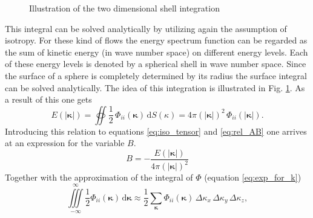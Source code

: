 \documentclass[preprint,12pt,ntfdMod]{elsarticle}
\begin{document}
\begin{par}
\begin{figure}[t!]
      \label{fig:shell_int}
      \caption{Illustration of the two dimensional shell integration}
  \end{figure}
This integral can be solved analytically by utilizing again the assumption of isotropy.
For these kind of flows the energy spectrum function can be regarded as the sum of kinetic energy
(in wave number space) on different energy levels. Each of these energy levels is denoted by a spherical
shell in wave number space. Since the surface of a sphere is completely determined by its radius the
surface integral can be solved analytically. The idea of this integration is illustrated
in Fig. \ref{fig:shell_int}.
As a result of this one gets
  \begin{equation}
      E(|\boldsymbol\kappa|)=\oiint\frac{1}{2}\,\Phi_{ii}(\boldsymbol\kappa)\,\mathrm{d}S(\kappa)
      =4\pi(|\boldsymbol\kappa|)^2\,\Phi_{ii}(|\boldsymbol\kappa|).
  \end{equation}
Introducing this relation to equations \eqref{eq:iso_tensor} and
\eqref{eq:rel_AB} one arrives at an expression for the variable $B$.
  \begin{equation}
      B=-\frac{E(|\boldsymbol\kappa|)}{4\pi(|\boldsymbol\kappa|)^2}
  \end{equation}
Together with the approximation of the integral of $\Phi$
(equation \eqref{eq:exp_for_k})
  \begin{equation}
      \label{eq:Phi_approx}
      \iiint\limits_{-\infty}^{\infty}\frac{1}{2}\Phi_{ii}(\boldsymbol\kappa)\,\mathrm{d}\boldsymbol\kappa
      \approx\frac{1}{2}\sum\limits_{\boldsymbol\kappa}\Phi_{ii}(\boldsymbol\kappa)
      \,\Delta\kappa_x\,\Delta\kappa_y\,\Delta\kappa_z,
  \end{equation}
\begin{figure}[t!]
      \centering

\end{figure}
\end{par}
\end{document}
